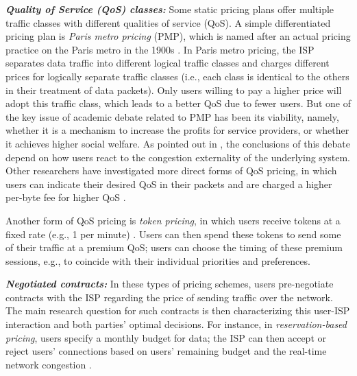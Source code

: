 \textbf{\emph{Quality of Service (QoS) classes:}}
Some static pricing plans offer multiple traffic classes with different qualities of service (QoS). A simple differentiated pricing plan is \emph{Paris metro pricing} (PMP), which is named after an actual pricing practice on the Paris metro in the 1900s \cite{Odlyzko}. In Paris metro pricing, the ISP separates data traffic into different logical traffic classes and charges different prices for logically separate traffic classes (i.e., each class is identical to the others in their treatment of data packets). Only users willing to pay a higher price will adopt this traffic class, which leads to a better QoS due to fewer users. But one of the key issue of academic debate related to PMP has been its viability, namely,  whether it is a mechanism to increase the profits for service providers, or whether it achieves higher social welfare. As pointed out in \cite{Chiu2010}, the conclusions of this debate depend on how users react to the congestion externality of the underlying system. Other researchers have investigated more direct forms of QoS pricing, in which users can indicate their desired QoS in their packets and are charged a higher per-byte fee for higher QoS \cite{Cocchi1,Marbach,M3I}. %


Another form of QoS pricing is \emph{token pricing}, in which users receive tokens at a fixed rate (e.g., 1 per minute) \cite{Token}. Users can then spend these tokens to send some of their traffic at a premium QoS; users can choose the timing of these premium sessions, e.g., to coincide with their individual priorities and preferences. %

\textbf{\emph{Negotiated contracts:}}
In these types of pricing schemes, users pre-negotiate contracts with the ISP regarding the price of sending traffic over the network. The main research question for such contracts is then characterizing this user-ISP interaction and both parties' optimal decisions. For instance, in \emph{reservation-based pricing}, users specify a monthly budget for data; the ISP can then accept or reject users' connections based on users' remaining budget and the real-time network congestion \cite{Delgrossi,PKF, ParrisF}. 


